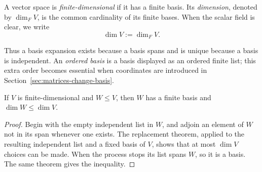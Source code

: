 \begin{definition}
A vector space is \emph{finite-dimensional} if it has a finite basis. Its
\emph{dimension}, denoted by \(\dim_FV\), is the common cardinality of its
finite bases. When the scalar field is clear, we write
\[
\dim V:=\dim_FV.
\]
\end{definition}

Thus a basis expansion exists because a basis spans and is unique because a
basis is independent. An \emph{ordered basis} is a basis displayed as an
ordered finite list; this extra order becomes essential when coordinates are
introduced in Section~\ref{sec:matrices-change-basis}.

\begin{proposition}\label{prop:finite-subspaces}
If \(V\) is finite-dimensional and \(W\leq V\), then \(W\) has a finite
basis and \(\dim W\leq\dim V\).
\end{proposition}
\begin{proof}
Begin with the empty independent list in \(W\), and adjoin an element of
\(W\) not in its span whenever one exists. The replacement theorem, applied
to the resulting independent list and a fixed basis of \(V\), shows that at
most \(\dim V\) choices can be made. When the process stops its list spans
\(W\), so it is a basis. The same theorem gives the inequality.
\end{proof}

